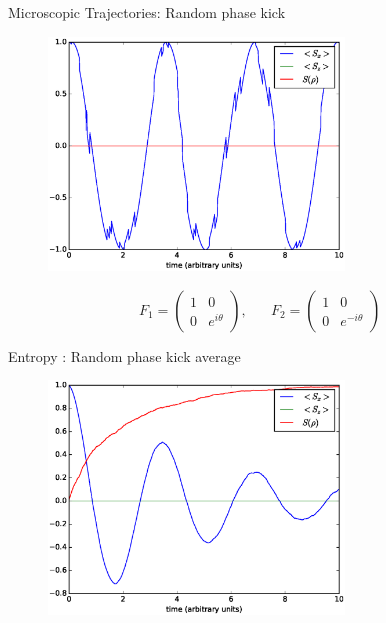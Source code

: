 \documentclass{beamer}
\begin{document}
\begin{frame}{Microscopic Trajectories: Random phase kick}
	\begin{figure}[h]
		\centering
		\includegraphics[width=0.7\textwidth]{figs/phase_jump_1.eps}
	\end{figure}
	\begin{equation*}
	F_1 =
	\begin{pmatrix}
	1 & 0 \\
	0 & e^{i\theta} 
	\end{pmatrix},\hspace{20pt}
	F_2 = 
	\begin{pmatrix}
	1 & 0 \\
	0 & e^{-i\theta} 
	\end{pmatrix}
	\end{equation*}
\end{frame}

\begin{frame}{Entropy :  Random phase kick average}
	\begin{figure}[h]
		\centering
		\includegraphics[width=0.7\textwidth]{figs/phase_jump_1000.eps}
	\end{figure}
\end{frame}
\end{document}
